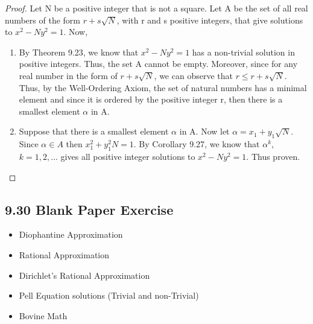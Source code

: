 \documentclass{article}
\begin{document}
\begin{proof}
Let N be a positive integer that is not a square. Let A be the set of all real numbers of the form $r + s\sqrt{N}$, with r and s positive integers, that give solutions to $x^2 - Ny^2 = 1$. Now, 
\begin{enumerate}
    \item By Theorem 9.23, we know that $x^2 - Ny^2 = 1$ has a non-trivial solution in positive integers. Thus, the set A cannot be empty. Moreover, since for any real number in the form of $r + s\sqrt{N}$, we can observe that $r \leq r + s\sqrt{N}$. Thus, by the Well-Ordering Axiom, the set of natural numbers has a minimal element and since it is ordered by the positive integer r, then there is a smallest element $\alpha$ in A.
    \item Suppose that there is a smallest element $\alpha$ in A. Now let $\alpha = x_1 + y_1\sqrt{N}$. Since $\alpha \in A$ then $x_1^2 + y_1^2N = 1$. By Corollary 9.27, we know that $\alpha^k$, $k = 1,2,...$ gives all positive integer solutions to $x^2  -Ny^2 = 1$. Thus proven.
\end{enumerate}
\end{proof}

\subsection*{9.30 Blank Paper Exercise} 
\begin{itemize}
    \item Diophantine Approximation
    \item Rational Approximation
    \item Dirichlet's Rational Approximation
    \item Pell Equation solutions (Trivial and non-Trivial)
    \item Bovine Math
\end{itemize}
\end{document}
